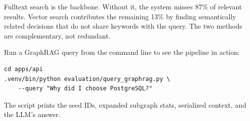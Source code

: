 \begin{keyinsight}
Fulltext search is the backbone.  Without it, the system misses 87\% of
relevant results.  Vector search contributes the remaining 13\% by finding
semantically related decisions that do not share keywords with the query.
The two methods are complementary, not redundant.
\end{keyinsight}

\begin{tryit}
Run a GraphRAG query from the command line to see the pipeline in action:
\begin{lstlisting}[style=bash, numbers=none]
cd apps/api
.venv/bin/python evaluation/query_graphrag.py \
    --query "Why did I choose PostgreSQL?"
\end{lstlisting}
The script prints the seed IDs, expanded subgraph stats, serialized
context, and the LLM's answer.
\end{tryit}
